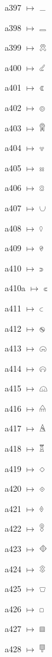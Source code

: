 {\noindent a397 $\mapsto$ {\ahfont 𔗁}\par
\noindent a398 $\mapsto$ {\ahfont 𔗂}\par
\noindent a399 $\mapsto$ {\ahfont 𔗃}\par
\noindent a400 $\mapsto$ {\ahfont 𔗄}\par
\noindent a401 $\mapsto$ {\ahfont 𔗅}\par
\noindent a402 $\mapsto$ {\ahfont 𔗆}\par
\noindent a403 $\mapsto$ {\ahfont 𔗇}\par
\noindent a404 $\mapsto$ {\ahfont 𔗈}\par
\noindent a405 $\mapsto$ {\ahfont 𔗉}\par
\noindent a406 $\mapsto$ {\ahfont 𔗊}\par
\noindent a407 $\mapsto$ {\ahfont 𔗋}\par
\noindent a408 $\mapsto$ {\ahfont 𔗌}\par
\noindent a409 $\mapsto$ {\ahfont 𔗍}\par
\noindent a410 $\mapsto$ {\ahfont 𔗎}\par
\noindent a410a $\mapsto$ {\ahfont 𔗏}\par
\noindent a411 $\mapsto$ {\ahfont 𔗐}\par
\noindent a412 $\mapsto$ {\ahfont 𔗑}\par
\noindent a413 $\mapsto$ {\ahfont 𔗒}\par
\noindent a414 $\mapsto$ {\ahfont 𔗓}\par
\noindent a415 $\mapsto$ {\ahfont 𔗔}\par
\noindent a416 $\mapsto$ {\ahfont 𔗕}\par
\noindent a417 $\mapsto$ {\ahfont 𔗖}\par
\noindent a418 $\mapsto$ {\ahfont 𔗗}\par
\noindent a419 $\mapsto$ {\ahfont 𔗘}\par
\noindent a420 $\mapsto$ {\ahfont 𔗙}\par
\noindent a421 $\mapsto$ {\ahfont 𔗚}\par
\noindent a422 $\mapsto$ {\ahfont 𔗛}\par
\noindent a423 $\mapsto$ {\ahfont 𔗜}\par
\noindent a424 $\mapsto$ {\ahfont 𔗝}\par
\noindent a425 $\mapsto$ {\ahfont 𔗞}\par
\noindent a426 $\mapsto$ {\ahfont 𔗟}\par
\noindent a427 $\mapsto$ {\ahfont 𔗠}\par
\noindent a428 $\mapsto$ {\ahfont 𔗡}\par
}
